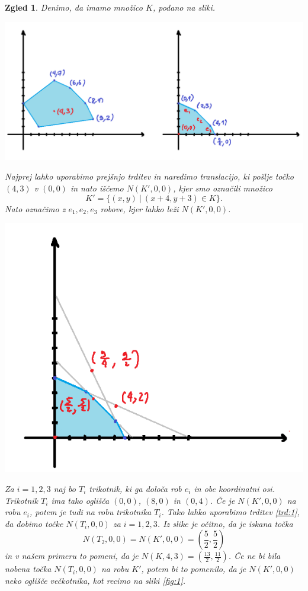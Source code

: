 \documentclass[10pt, a4paper]{article}
\newtheorem{zgled}[izr]{Zgled}
\begin{document}
\begin{zgled}
  Denimo, da imamo množico $K$, podano na sliki.
  \begin{center}
    \includegraphics[scale=0.6]{images/slika6.png}
  \end{center}
  Najprej lahko uporabimo prejšnjo trditev in naredimo translacijo,
  ki pošlje točko $(4, 3)$ v $(0, 0)$ in nato iščemo $N(K', 0, 0)$,
  kjer smo označili množico $$K' = \{(x, y)\ |\ (x + 4, y + 3) \in K\}.$$
  Nato označimo z $e_1, e_2, e_3$ robove, kjer lahko leži $N(K', 0, 0)$.
  \begin{center}
    \includegraphics[scale=0.8]{images/slika7.png}
  \end{center}
  Za $i = 1, 2, 3$ naj bo $T_i$ trikotnik, ki ga določa rob $e_i$ in obe koordinatni osi.
  Trikotnik $T_i$ ima tako oglišča $(0, 0)$, $(8, 0)$ in $(0, 4)$.
  Če je $N(K', 0, 0)$ na robu $e_i$, potem je tudi na robu trikotnika $T_i$.
  Tako lahko uporabimo trditev \ref{trd:1}, da dobimo točke 
  $N(T_i, 0, 0)$ za $i = 1, 2, 3$. Iz slike je očitno, da je iskana točka 
  $$N(T_2, 0, 0) = N(K', 0, 0) = \left(\frac{5}{2}, \frac{5}{2}\right)$$
  in v našem primeru to pomeni, da je $N(K, 4, 3) = \left(\frac{13}{2}, \frac{11}{2}\right)$.
  Če ne bi bila nobena točka $N(T_i, 0, 0)$ na robu $K'$, potem bi to pomenilo, 
  da je $N(K', 0, 0)$ neko oglišče večkotnika, kot recimo na sliki \ref{fig:1}.
\end{zgled}
\end{document}
